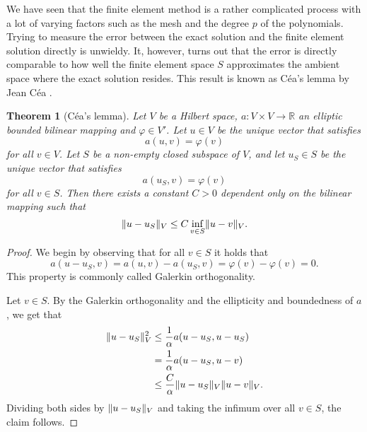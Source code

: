 \documentclass[english, 12pt, a4paper, sci, utf8, a-2b, online]{aaltothesis}
\theoremstyle{definition}
\theoremstyle{plain}
\newtheorem{theorem}{Theorem}[section]
\DeclarePairedDelimiter\norm{\lVert}{\rVert}
\numberwithin{equation}{section}
\begin{document}
We have seen that the finite element method is a rather complicated
process with a lot of varying factors such as the mesh and the degree $p$
of the polynomials. Trying to measure the error between the exact solution
and the finite element solution directly is unwieldy.
It, however, turns out that the error is directly comparable to
how well the finite element space $S$ approximates the ambient space
where the exact solution resides.
This result is known as Céa's lemma by Jean Céa \cite{cea1964}.
\begin{theorem}[Céa's lemma]
    \label{thm:ceas_lemma}
    Let $V$ be a Hilbert space,
    $a: V \times V \to \mathbb{R}$ an elliptic bounded bilinear mapping
    and $\varphi \in V'$.
    Let $u \in V$ be the unique vector that satisfies
    \begin{equation*}
        a(u,v) = \varphi(v)
    \end{equation*}
    for all $v \in V$.
    Let $S$ be a non-empty closed subspace of $V$,
    and let $u_S \in S$ be the unique vector that satisfies
    \begin{equation*}
        a(u_S,v) = \varphi(v)
    \end{equation*}
    for all $v \in S$.
    Then there exists a constant $C > 0$ dependent only on the bilinear mapping
    such that
    \begin{equation*}
        \norm{u - u_S}_V \leq C \inf_{v \in S} \norm{u - v}_V.
    \end{equation*}
\end{theorem}
\begin{proof}
    We begin by observing that for all $v \in S$ it holds that
    \begin{equation*}
        a(u-u_S,v) = a(u,v) - a(u_S,v) = \varphi(v) - \varphi(v) = 0.
    \end{equation*}
    This property is commonly called Galerkin orthogonality.

    Let $v \in S$.
    By the Galerkin orthogonality and the ellipticity and boundedness of $a$, we get that
    \begin{align*}
        \norm{u-u_S}_V^2
        &\leq \frac{1}{\alpha} a(u-u_S,u-u_S) \\
        &= \frac{1}{\alpha} a(u-u_S,u-v) \\
        &\leq \frac{C}{\alpha} \norm{u-u_S}_V \norm{u-v}_V.
    \end{align*}
    Dividing both sides by $\norm{u-u_S}_V$
    and taking the infimum over all $v \in S$,
    the claim follows.
\end{proof}
\end{document}
